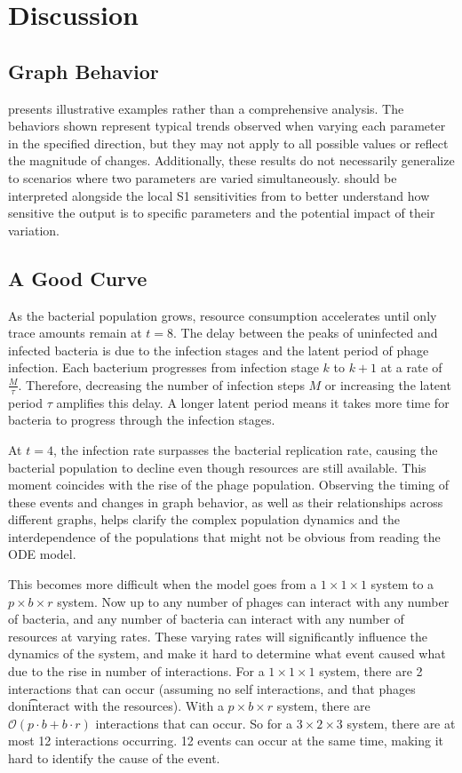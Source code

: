 \chapter{Discussion}
\label{Discussion}

\section{Graph Behavior}
 presents illustrative examples rather than a comprehensive analysis. 
The behaviors shown represent typical trends observed when varying each parameter in the specified direction, but they may not apply to all possible values or reflect the magnitude of changes. 
Additionally, these results do not necessarily generalize to scenarios where two parameters are varied simultaneously. 
 should be interpreted alongside the local S1 sensitivities from  to better understand how sensitive the output is to specific parameters and the potential impact of their variation.

\section{A Good Curve}
As the bacterial population grows, resource consumption accelerates until only trace amounts remain at $t=8$. 
The delay between the peaks of uninfected and infected bacteria is due to the infection stages and the latent period of phage infection. 
Each bacterium progresses from infection stage $k$ to $k+1$ at a rate of $\frac{M}{\tau}$. 
Therefore, decreasing the number of infection steps $M$ or increasing the latent period $\tau$ amplifies this delay. 
A longer latent period means it takes more time for bacteria to progress through the infection stages.

At $t=4$, the infection rate surpasses the bacterial replication rate, causing the bacterial population to decline even though resources are still available. 
This moment coincides with the rise of the phage population. 
Observing the timing of these events and changes in graph behavior, as well as their relationships across different graphs, helps clarify the complex population dynamics and the interdependence of the populations that might not be obvious from reading the ODE model. 

This becomes more difficult when the model goes from a $1\times1\times1$ system to a $p\times b \times r$ system. 
Now up to any number of phages can interact with any number of bacteria, and any number of bacteria can interact with any number of resources at varying rates. 
These varying rates will significantly influence the dynamics of the system, and make it hard to determine what event caused what due to the rise in number of interactions.
For a $1\times1\times1$ system, there are 2 interactions that can occur (assuming no self interactions, and that phages don\t interact with the resources). 
With a $p\times b\times r$ system, there are $\mathcal{O}(p\cdot b + b\cdot r)$ interactions that can occur. 
So for a $3\times2\times3$ system, there are at most 12 interactions occurring. 
12 events can occur at the same time, making it hard to identify the cause of the event. 


